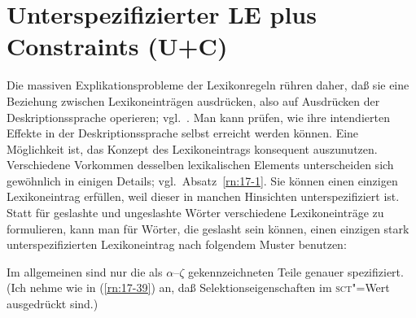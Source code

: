 \documentclass[output=paper]{LSP/langsci}
\begin{document}
\section{Unterspezifizierter LE plus Constraints (U+C)}

\randnum\label{rn:17-70}Die massiven
Explikationsprobleme der Lexikonregeln rühren daher, daß sie eine
Beziehung zwischen Lexikoneinträgen ausdrücken, also auf Ausdrücken
der Deskriptionssprache operieren; vgl.\ \citet[395 Anm.~1]{PollardSag1994}. Man
kann prüfen, wie ihre intendierten Effekte in der Deskriptionssprache
selbst erreicht werden können. Eine Möglichkeit ist, das Konzept des
Lexikoneintrags konsequent auszunutzen. Verschiedene Vorkommen
desselben lexikalischen Elements unterscheiden sich gewöhnlich in
einigen Details; vgl.\ Absatz~\ref{rn:17-1}. Sie können einen einzigen Lexikoneintrag
erfüllen, weil dieser in manchen Hinsichten unterspezifiziert
ist. Statt für geslashte und ungeslashte Wörter verschiedene
Lexikoneinträge zu formulieren, kann man für Wörter, die geslasht sein
können, einen einzigen stark unterspezifizierten Lexikoneintrag nach
folgendem Muster benutzen:
\begin{exe}
\ex\label{rn:17-71}
\begin{avm}
\end{avm}
\end{exe}

\addlines[-1]
\noindent
Im allgemeinen sind nur die als $\alpha$--$\zeta$ gekennzeichneten Teile genauer
spezifiziert. (Ich nehme wie in (\ref{rn:17-39}) an, daß
Selektionseigenschaften im \textsc{sct}"=Wert ausgedrückt sind.)
\end{document}
